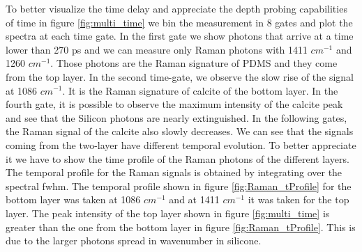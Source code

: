 \documentclass{osa-article}
\begin{document}
To better visualize the time delay and appreciate the depth probing capabilities of time in figure \ref{fig:multi_time} we bin the measurement in 8 gates and plot the spectra at each time gate. In the first gate we show photons that arrive at a time lower than 270 ps and we can measure only Raman photons with 1411 $cm^{-1}$ and 1260 $cm^{-1}$. Those photons are the Raman signature of PDMS and they come from the top layer. In the second time-gate, we observe the slow rise of the signal at 1086 $cm^{-1}$. It is the Raman signature of calcite of the bottom layer. In the fourth gate, it is possible to observe the maximum intensity of the calcite peak and see that the Silicon photons are nearly extinguished. In the following gates, the Raman signal of the calcite also slowly decreases.
We can see that the signals coming from the two-layer have different temporal evolution. To better appreciate it we have to show the time profile of the Raman photons of the different layers.
The temporal profile for the Raman signals is obtained by integrating over the spectral fwhm. The temporal profile shown in figure \ref{fig:Raman_tProfile}  for the bottom layer was taken at 1086 $cm^{-1}$ and at 1411 $cm^{-1}$ it was taken for the top layer. The peak intensity of the top layer shown in figure  \ref{fig:multi_time} is greater than the one from the bottom layer in figure \ref{fig:Raman_tProfile}. This is due to the larger photons spread in wavenumber in silicone. 
\end{document}
